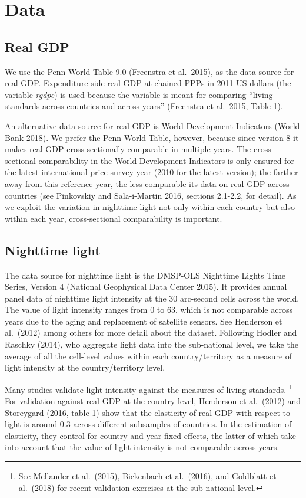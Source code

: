 \documentclass[12pt,a4paper]{article}%
\begin{document}
\section{Data}
\subsection{Real GDP}
We use the Penn World Table 9.0 (Freenstra et al.\ 2015), as the data source for real GDP. 
Expenditure-side real GDP at chained PPPs in 2011 US dollars (the variable \textit{rgdpe}) is used because the variable is meant for comparing ``living standards across countries and across years'' (Freenstra et al.\ 2015, Table 1).

An alternative data source for real GDP is World Development Indicators (World Bank 2018). 
We prefer the Penn World Table, however, because since version 8 it makes real GDP cross-sectionally comparable in multiple years. 
The cross-sectional comparability in the World Development Indicators is only ensured for the latest international price survey year (2010 for the latest version); the farther away from this reference year, the less comparable its data on real GDP across countries (see Pinkovskiy and Sala-i-Martin 2016, sections 2.1-2.2, for detail).
As we exploit the variation in nighttime light not only within each country but also within each year, cross-sectional comparability is important.

\subsection{Nighttime light}
The data source for nighttime light is the DMSP-OLS Nighttime Lights Time Series, Version 4 (National Geophysical Data Center 2015). 
It provides annual panel data of nighttime light intensity at the 30 arc-second cells across the world. 
The value of light intensity ranges from 0 to 63, which is not comparable across years due to the aging and replacement of satellite sensors. 
See Henderson et al.\ (2012) among others for more detail about the dataset.
Following Hodler and Raschky (2014), who aggregate light data into the sub-national level, we take the average of all the cell-level values within each country/territory as a measure of light intensity at the country/territory level.

Many studies validate light intensity against the measures of living standards.%
\footnote{See Mellander et al.\ (2015), Bickenbach et al.\ (2016), and Goldblatt et al.\ (2018) for recent validation exercises at the sub-national level.} 
For validation against real GDP at the country level, Henderson et al.\ (2012) and Storeygard (2016, table 1) show that the elasticity of real GDP with respect to light is around 0.3 across different subsamples of countries. 
In the estimation of elasticity, they control for country and year fixed effects, the latter of which take into account that the value of light intensity is not comparable across years.
\end{document}
